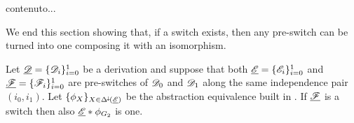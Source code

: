 \begin{corollary}\label{cor:swdeco}
	contenuto...
\end{corollary}


We end this section showing that, if a switch exists, then any pre-switch can be turned into one composing it with an isomorphism.

\begin{proposition}\label{prop:pretosw} 	Let $\underline{\mathscr{D}}=\{\mathscr{D}_{i}\}_{i=0}^1$ be a derivation and suppose
	that both $\underline{\mathscr{E}}=\{\mathscr{E}_i\}_{i=0}^1$ and
	$\underline{\mathscr{F}}=\{\mathscr{F}_i\}_{i=0}^1$ are pre-switches of $\mathscr{D}_0$ and
	$\mathscr{D}_1$ along the same independence pair $(i_0, i_1)$. Let $\{\phi_X\}_{X\in \Delta^{\hspace{-1pt}\downarrow\hspace{-1pt}}(\underline{\mathscr{E}})}$ be the abstraction equivalence built in . If $\underline{\mathscr{F}}$ is a switch then also $\underline{\mathscr{E}}*\phi_{G_2}$ is one.
\end{proposition}
